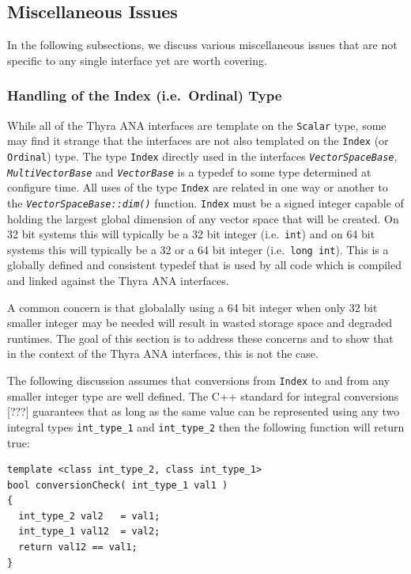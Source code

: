 \documentclass[pdf,ps2pdf,11pt]{SANDreport}
\begin{document}
%
\subsection{Miscellaneous Issues}
%

In the following subsections, we discuss various miscellaneous issues that are
not specific to any single interface yet are worth covering.

%
\subsubsection{Handling of the Index (i.e.\ Ordinal) Type}
%

While all of the Thyra ANA interfaces are template on the {}\texttt{Scalar}
type, some may find it strange that the interfaces are not also templated on
the {}\texttt{Index} (or {}\texttt{Ordinal}) type.  The type {}\texttt{Index}
directly used in the interfaces {}\textit{\texttt{Vector\-Space\-Base}},
{}\textit{\texttt{Multi\-Vector\-Base}} and {}\textit{\texttt{Vector\-Base}}
is a typedef to some type determined at configure time.  All uses of the type
{}\texttt{Index} are related in one way or another to the
{}\textit{\texttt{Vector\-Space\-Base\-::dim()}} function.  {}\texttt{Index}
must be a signed integer capable of holding the largest global dimension of
any vector space that will be created.  On 32 bit systems this will typically
be a 32 bit integer (i.e.\ {}\texttt{int}) and on 64 bit systems this will
typically be a 32 or a 64 bit integer (i.e.\ {}\texttt{long int}).  This is a
globally defined and consistent typedef that is used by all code which is
compiled and linked against the Thyra ANA interfaces.

A common concern is that globalally using a 64 bit integer when only 32 bit
smaller integer may be needed will result in wasted storage space and degraded
runtimes.  The goal of this section is to address these concerns and to show
that in the context of the Thyra ANA interfaces, this is not the case.

The following discussion assumes that conversions from {}\texttt{Index} to and
from any smaller integer type are well defined.  The C++ standard for integral
conversions [???] guarantees that as long as the same value can be represented
using any two integral types {}\texttt{int\-\_type\-\_1} and
{}\texttt{int\-\_type\-\_2} then the following function will return true:

{\scriptsize\begin{verbatim}
template <class int_type_2, class int_type_1>
bool conversionCheck( int_type_1 val1 )
{
  int_type_2 val2   = val1;
  int_type_1 val12  = val2;
  return val12 == val1;
}
\end{verbatim}}
\end{document}
